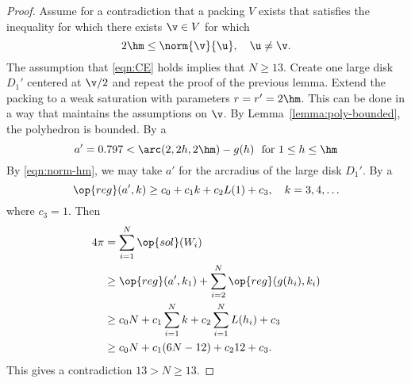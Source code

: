 \begin{proof} Assume for a contradiction that a packing $V$ exists that
  satisfies the inequality for which there exists $\v\in V$ for which 
\begin{equation}\label{eqn:norm-hm}
2\hm\le\norm{\v}{\u},\quad \u\ne \v.
\end{equation}
The assumption that \eqref{eqn:CE} holds implies that $N\ge 13$.
Create one large disk $D_1'$ centered at $\v/2$ and repeat the proof
of the previous lemma.  Extend the packing to a  weak saturation
with parameters $r=r'=2\hm$.  This can be done in a way that maintains
the assumptions on $\v$.  By Lemma~\ref{lemma:poly-bounded}, the
polyhedron is bounded.  By a  %
\[ a'=0.797 < \arc(2,2h,2\hm)-g(h)\text{\ \ for } 1\le h \le \hm\]  
By \eqref{eqn:norm-hm}, we may take $a'$
for the arcradius of the large disk $D_1'$.  
By a    %
\begin{equation}\label{eqn:alin2} 
\op{reg}(a',k) \ge c_0 + c_1 k + c_2 L(1) +
c_3,\quad k=3,4,\ldots\end{equation}
where
$c_3 =  1$.  %
Then 
\begin{align*} \label{eqn:D'}
4\pi &= \sum_{i=1}^{N}\op{sol}(W_i)\\
&\ge \op{reg}(a',k_1)+\sum_{i=2}^{N} \op{reg}(g(h_i),k_i) \\
&\ge  c_0 N +c_1\sum_{i=1}^{N} k + c_2 \sum_{i=1}^{N} L(h_i) + c_3\\
&\ge c_0 N +c_1 (6N-12) + c_2 12 + c_3.
\end{align*}
This gives a contradiction
$13 > N \ge 13.$
\end{proof}
